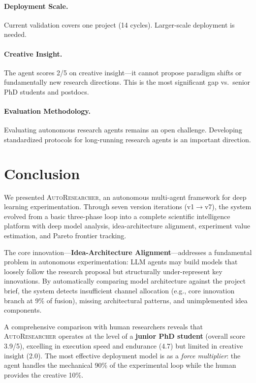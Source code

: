 \documentclass[11pt,a4paper]{article}
\newcommand{\sysname}{\textsc{AutoResearcher}}
\begin{document}
\paragraph{Deployment Scale.}
Current validation covers one project (14 cycles). Larger-scale deployment is needed.

\paragraph{Creative Insight.}
The agent scores 2/5 on creative insight---it cannot propose paradigm shifts or fundamentally new research directions. This is the most significant gap vs.\ senior PhD students and postdocs.

\paragraph{Evaluation Methodology.}
Evaluating autonomous research agents remains an open challenge. Developing standardized protocols for long-running research agents is an important direction.


\section{Conclusion}

We presented \sysname, an autonomous multi-agent framework for deep learning experimentation.
Through seven version iterations (v1$\to$v7), the system evolved from a basic three-phase loop into a complete scientific intelligence platform with deep model analysis, idea-architecture alignment, experiment value estimation, and Pareto frontier tracking.

The core innovation---\textbf{Idea-Architecture Alignment}---addresses a fundamental problem in autonomous experimentation: LLM agents may build models that loosely follow the research proposal but structurally under-represent key innovations.
By automatically comparing model architecture against the project brief, the system detects insufficient channel allocation (e.g., core innovation branch at 9\% of fusion), missing architectural patterns, and unimplemented idea components.

A comprehensive comparison with human researchers reveals that \sysname{} operates at the level of a \textbf{junior PhD student} (overall score 3.9/5), excelling in execution speed and endurance (4.7) but limited in creative insight (2.0).
The most effective deployment model is as a \emph{force multiplier}: the agent handles the mechanical 90\% of the experimental loop while the human provides the creative 10\%.
\end{document}
